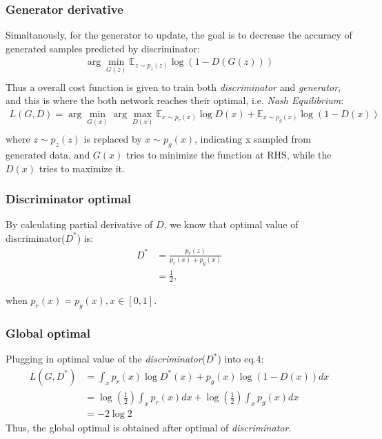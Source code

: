 \documentclass{article}
\newcommand{\argmax}{\arg\!\max}
\newcommand{\argmin}{\arg\!\min}
\begin{document}
\subsubsection*{Generator derivative}
Simaltanously, for the generator to update, the goal is to decrease the accuracy of generated samples predicted by discriminator:
\begin{equation}
    \begin{gathered}
\argmin_{G(z)} \mathbb{E}_{z\sim p_{z}(z)} \log{(1-D(G(z)))}\\
    \end{gathered}
\end{equation}
Thus a overall cost function is given to train both \textit{discriminator} and \textit{generator}, and this is where the both network reaches their optimal, i.e. \textit{Nash Equilibrium}:
\begin{equation}
    \begin{gathered}
\textit{L}(G,D) = \argmin_{G(x)} \argmax_{D(x)} \mathbb{E}_{x\sim p_{r}(x)} \log{D(x)} + \mathbb{E}_{x\sim p_{g}(x)} \log{(1-D(x))}\\
    \end{gathered}
\end{equation}
where $z\sim p_z{(z)}$ is replaced by $x\sim p_g{(x)}$, indicating x sampled from generated data, and $G(x)$ tries to minimize the function at RHS, while the $D(x)$ tries to maximize it.
\subsubsection*{Discriminator optimal}
By calculating partial derivative of $D$, we know that optimal value of discriminator($D^*$) is:
\begin{align}\label{eq5}
D^{*} &= \frac{p_{r}(z)}{p_{r}(x)+p_{g}(x)} \nonumber\\
&= \frac{1}{2},
\end{align}

when $p_{r}(x) = p_{g}(x), x\in [0,1]$.
\subsubsection*{Global optimal}
Plugging in optimal value of the \textit{discriminator}($D^*$) into eq.4:
\begin{align}
    \textit{L}(G,D^*) &= \int_{x}p_{r}(x)\log{D^*(x)} + p_{g}(x)\log{(1-D(x))}dx \\
    &=\log(\frac{1}{2})\int_{x}p_{r}(x)dx + \log(\frac{1}{2})\int_{x}p_{g}(x)dx\\
    &=-2\log{2}
\end{align}
Thus, the global optimal is obtained after optimal of \textit{discriminator}.
\end{document}
